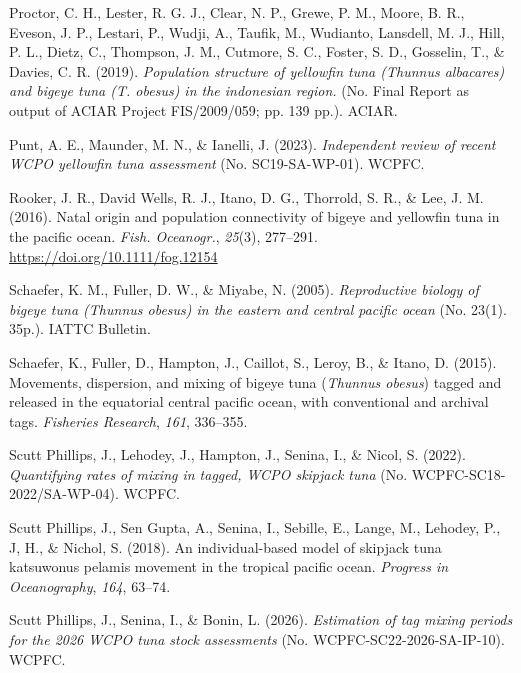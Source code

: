 \documentclass[
  english,
  a4paper,
  a4paper,
  11pt]{SCreport}
\newlength{\cslhangindent}
\newenvironment{CSLReferences}[2] %
 {\begin{list}{}{%
  \setlength{\itemindent}{0pt}
  \setlength{\leftmargin}{0pt}
  \setlength{\parsep}{0pt}
  \ifodd #1
   \setlength{\leftmargin}{\cslhangindent}
   \setlength{\itemindent}{-1\cslhangindent}
  \fi
  \setlength{\itemsep}{#2\baselineskip}}}
 {\end{list}}
\begin{document}
\begin{CSLReferences}{1}{0}
Proctor, C. H., Lester, R. G. J., Clear, N. P., Grewe, P. M., Moore, B.
R., Eveson, J. P., Lestari, P., Wudji, A., Taufik, M., Wudianto,
Lansdell, M. J., Hill, P. L., Dietz, C., Thompson, J. M., Cutmore, S.
C., Foster, S. D., Gosselin, T., \& Davies, C. R. (2019).
\emph{Population structure of yellowfin tuna ({\emph{Thunnus
albacares}}) and bigeye tuna ({\emph{T. obesus}}) in the indonesian
region.} (No. Final Report as output of {ACIAR} Project {FIS}/2009/059;
pp. 139 pp.). ACIAR.

Punt, A. E., Maunder, M. N., \& Ianelli, J. (2023). \emph{Independent
review of recent {WCPO} yellowfin tuna assessment} (No.
{SC}19-{SA}-{WP}-01). WCPFC.

Rooker, J. R., David Wells, R. J., Itano, D. G., Thorrold, S. R., \&
Lee, J. M. (2016). Natal origin and population connectivity of bigeye
and yellowfin tuna in the pacific ocean. \emph{Fish. Oceanogr.},
\emph{25}(3), 277--291. \url{https://doi.org/10.1111/fog.12154}

Schaefer, K. M., Fuller, D. W., \& Miyabe, N. (2005). \emph{Reproductive
biology of bigeye tuna ({\emph{Thunnus obesus}}) in the eastern and
central pacific ocean} (No. 23(1). 35p.). {IATTC} Bulletin.

Schaefer, K., Fuller, D., Hampton, J., Caillot, S., Leroy, B., \& Itano,
D. (2015). Movements, dispersion, and mixing of bigeye tuna
({\emph{Thunnus obesus}}) tagged and released in the equatorial central
pacific ocean, with conventional and archival tags. \emph{Fisheries
Research}, \emph{161}, 336--355.

Scutt Phillips, J., Lehodey, J., Hampton, J., Senina, I., \& Nicol, S.
(2022). \emph{Quantifying rates of mixing in tagged, {WCPO} skipjack
tuna} (No. {WCPFC}-{SC}18-2022/{SA}-{WP}-04). WCPFC.

Scutt Phillips, J., Sen Gupta, A., Senina, I., Sebille, E., Lange, M.,
Lehodey, P., J, H., \& Nichol, S. (2018). An individual-based model of
skipjack tuna katsuwonus pelamis movement in the tropical pacific ocean.
\emph{Progress in Oceanography}, \emph{164}, 63--74.

Scutt Phillips, J., Senina, I., \& Bonin, L. (2026). \emph{Estimation of
tag mixing periods for the 2026 {WCPO} tuna stock assessments} (No.
{WCPFC}-{SC}22-2026-{SA}-{IP}-10). WCPFC.


\end{CSLReferences}
\end{document}
